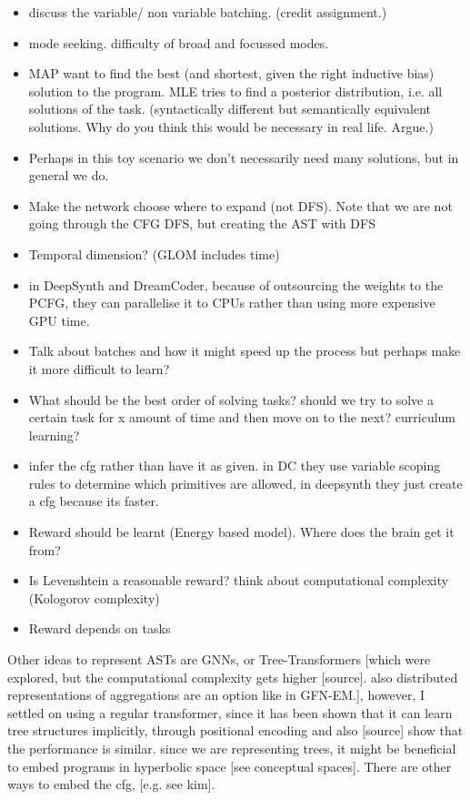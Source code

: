 \begin{itemize}
    \item discuss the variable/ non variable batching. (credit assignment.)
    \item mode seeking. difficulty of broad and focussed modes. 
    \item MAP want to find the best (and shortest, given the right inductive bias) solution to the program. MLE tries to find a posterior distribution, i.e. all solutions of the task. (syntactically different but semantically equivalent solutions. Why do you think this would be necessary in real life. Argue.) 
    \item Perhaps in this toy scenario we don't necessarily need many solutions, but in general we do. 
    \item Make the network choose where to expand (not DFS). Note that we are not going through the CFG DFS, but creating the AST with DFS
    \item Temporal dimension? (GLOM includes time)
    \item in DeepSynth and DreamCoder, because of outsourcing the weights to the PCFG, they can parallelise it to CPUs rather than using more expensive GPU time. 
    \item Talk about batches and how it might speed up the process but perhaps make it more difficult to learn?
    \item What should be the best order of solving tasks? should we try to solve a certain task for x amount of time and then move on to the next? curriculum learning? 
    \item infer the cfg rather than have it as given. in DC they use variable scoping rules to determine which primitives are allowed, in deepsynth they just create a cfg because its faster. 
    \item Reward should be learnt (Energy based model). Where does the brain get it from?
    \item Is Levenshtein a reasonable reward? think about computational complexity (Kologorov complexity)
    \item Reward depends on tasks
\end{itemize}

Other ideas to represent ASTs are GNNs, or Tree-Transformers [which were explored, but the computational complexity gets higher [source]. also distributed representations of aggregations are an option like in GFN-EM.], however, I settled on using a regular transformer, since it has been shown that it can learn tree structures implicitly, through positional encoding and also [source] show that the performance is similar.
since we are representing trees, it might be beneficial to embed programs in hyperbolic space [see conceptual spaces]. 
There are other ways to embed the cfg, [e.g. see kim].




